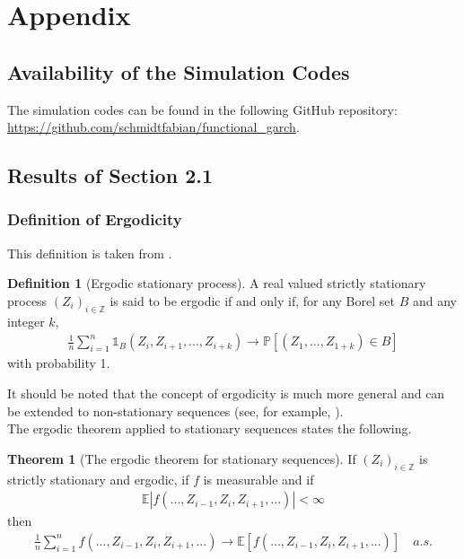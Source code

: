 \documentclass[12pt,a4paper]{article}
\theoremstyle{definition}
\newtheorem{definition}{Definition}[section]
\newtheorem{theorem}{Theorem}[section]
\begin{document}
\appendix
\clearpage
{}
\setcounter{page}{1}
\section{Appendix}
\label{sec:Appendix}
\subsection{Availability of the Simulation Codes}
The simulation codes can be found in the following GitHub repository: \url{https://github.com/schmidtfabian/functional_garch}.
\subsection{Results of Section 2.1}
\subsubsection{Definition of Ergodicity}
\label{subsec:DefErgodicity}
This definition is taken from \citet{francq2019garch}.
\begin{definition}[Ergodic stationary process]
    A real valued strictly stationary process $(Z_i)_{i\in\mathbb{Z}}$ is said to be ergodic if and only if, for any Borel set $B$ and any integer $k$,
    \begin{gather}
        \frac{1}{n}\sum_{i=1}^n  \mathds{1}_B(Z_i,Z_{i+1},...,Z_{i+k})\rightarrow \mathbb{P}[(Z_1,...,Z_{1+k})\in B]
    \end{gather}
    with probability 1.
\end{definition}
It should be noted that the concept of ergodicity is much more general and can be extended to non-stationary sequences (see, for example, \citet{billingsley1995probability}).\\
The ergodic theorem applied to stationary sequences states the following.
\begin{theorem}[The ergodic theorem for stationary sequences]
\label{ErgodicTheorem}
    If $(Z_i)_{i\in\mathbb{Z}}$ is strictly stationary and ergodic, if $f$ is measurable and if 
    \begin{gather}
        \mathbb{E}|f(...,Z_{i-1},Z_i,Z_{i+1},...)|<\infty
    \end{gather}
    then
    \begin{gather}
        \frac{1}{n}\sum_{i=1}^n f(...,Z_{i-1},Z_i,Z_{i+1},...)\rightarrow\mathbb{E}[f(...,Z_{i-1},Z_i,Z_{i+1},...)]\quad a.s.
    \end{gather}
\end{theorem}
\end{document}
